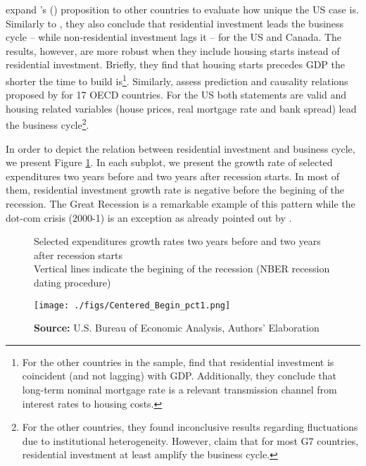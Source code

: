 \documentclass[12pt, a4paper]{article}
\begin{document}
\textcite{kydland_2016_housing} expand \citeauthor*{leamer_housing_2007}'s (\citeyear{leamer_housing_2007}) proposition to other countries to evaluate how unique the US case is.
Similarly to \textcite{green_follow_1997}, they also conclude that residential investment leads the business cycle -- while non-residential investment lags it -- for the US and Canada.
The results, however, are more robust when they include housing starts instead of residential investment.
Briefly, they find that housing starts precedes GDP the shorter the time to build is\footnote{For the other countries in the sample, \textcite{kydland_2016_housing} find that residential investment is coincident (and not lagging) with GDP. Additionally, they conclude that long-term nominal mortgage rate is a relevant transmission channel from interest rates to housing costs.}.
Similarly, \textcite{huang_is_2018} assess  prediction and causality relations proposed by \textcite{leamer_housing_2007} for 17 OECD countries.
For the US both statements are valid and housing related variables (house prices, real mortgage rate and bank spread) lead the business cycle\footnote{For the other countries, they found inconclusive results regarding fluctuations due to institutional heterogeneity. However, \textcite{huang_is_2018} claim that for most G7 countries, residential investment at least amplify the business cycle.}.


In order to depict the relation between residential investment and business cycle, we present Figure \ref{fig:cycle}.
In each subplot, we present the growth rate of selected expenditures two years before and two years after recession starts.
In most of them, residential investment growth rate is negative before the begining of the recession.
The Great Recession is a remarkable example of this pattern while the dot-com crisis (2000-1) is an exception as already pointed out by \textcite{leamer_housing_2007}.


\begin{figure}[H]
	\centering
	\caption{Selected expenditures growth rates two years before and two years after recession starts\\Vertical lines indicate the begining of the recession (NBER recession dating procedure)}
	\label{fig:cycle}
	\texttt{[image: ./figs/Centered\_Begin\_pct1.png]}
	\caption*{\textbf{Source:} U.S. Bureau of Economic Analysis, Authors' Elaboration}
\end{figure}
\end{document}
